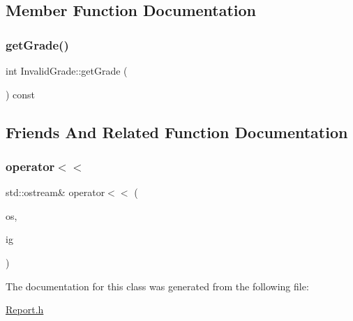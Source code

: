 \subsection{Member Function Documentation}
\mbox{\label{class_invalid_grade_a804b310f3aa6d5b388ff36dac76b06da}} 
\subsubsection{\texorpdfstring{get\+Grade()}{getGrade()}}
{\footnotesize\ttfamily int Invalid\+Grade\+::get\+Grade (\begin{DoxyParamCaption}{ }\end{DoxyParamCaption}) const\hspace{0.3cm}{\ttfamily [inline]}}



\subsection{Friends And Related Function Documentation}
\mbox{\label{class_invalid_grade_abd6d4b28be315c2b68592594412c7632}} 
\subsubsection{\texorpdfstring{operator$<$$<$}{operator<<}}
{\footnotesize\ttfamily std\+::ostream\& operator$<$$<$ (\begin{DoxyParamCaption}\item[{std\+::ostream \&}]{os,  }\item[{const \mbox{\hyperlink{class_invalid_grade}{Invalid\+Grade}} \&}]{ig }\end{DoxyParamCaption})\hspace{0.3cm}{\ttfamily [friend]}}



The documentation for this class was generated from the following file\+:\begin{DoxyCompactItemize}
\item 
\mbox{\hyperlink{_report_8h}{Report.\+h}}\end{DoxyCompactItemize}
